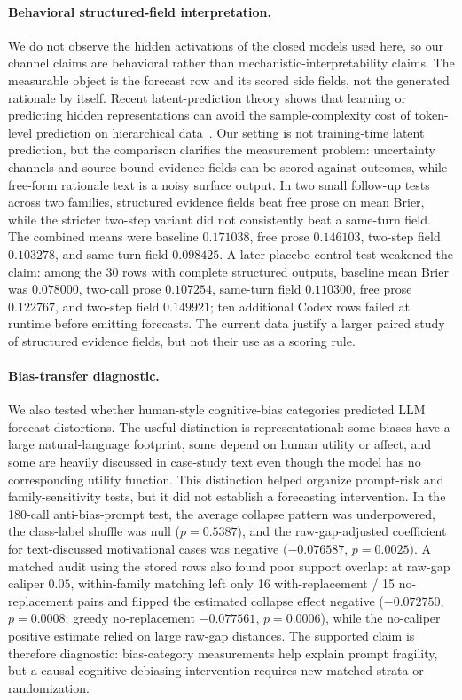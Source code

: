 \documentclass[11pt]{article}
\begin{document}
\paragraph{Behavioral structured-field interpretation.} We do not observe the hidden activations of the closed models used here, so our channel claims are behavioral rather than mechanistic-interpretability claims. The measurable object is the forecast row and its scored side fields, not the generated rationale by itself. Recent latent-prediction theory shows that learning or predicting hidden representations can avoid the sample-complexity cost of token-level prediction on hierarchical data~\cite{korchinski2026latents}. Our setting is not training-time latent prediction, but the comparison clarifies the measurement problem: uncertainty channels and source-bound evidence fields can be scored against outcomes, while free-form rationale text is a noisy surface output. In two small follow-up tests across two families, structured evidence fields beat free prose on mean Brier, while the stricter two-step variant did not consistently beat a same-turn field. The combined means were baseline $0.171038$, free prose $0.146103$, two-step field $0.103278$, and same-turn field $0.098425$. A later placebo-control test weakened the claim: among the 30 rows with complete structured outputs, baseline mean Brier was $0.078000$, two-call prose $0.107254$, same-turn field $0.110300$, free prose $0.122767$, and two-step field $0.149921$; ten additional Codex rows failed at runtime before emitting forecasts. The current data justify a larger paired study of structured evidence fields, but not their use as a scoring rule.

\paragraph{Bias-transfer diagnostic.} We also tested whether human-style cognitive-bias categories predicted LLM forecast distortions. The useful distinction is representational: some biases have a large natural-language footprint, some depend on human utility or affect, and some are heavily discussed in case-study text even though the model has no corresponding utility function. This distinction helped organize prompt-risk and family-sensitivity tests, but it did not establish a forecasting intervention. In the 180-call anti-bias-prompt test, the average collapse pattern was underpowered, the class-label shuffle was null ($p=0.5387$), and the raw-gap-adjusted coefficient for text-discussed motivational cases was negative ($-0.076587$, $p=0.0025$). A matched audit using the stored rows also found poor support overlap: at raw-gap caliper $0.05$, within-family matching left only 16 with-replacement / 15 no-replacement pairs and flipped the estimated collapse effect negative ($-0.072750$, $p=0.0008$; greedy no-replacement $-0.077561$, $p=0.0006$), while the no-caliper positive estimate relied on large raw-gap distances. The supported claim is therefore diagnostic: bias-category measurements help explain prompt fragility, but a causal cognitive-debiasing intervention requires new matched strata or randomization.
\end{document}
